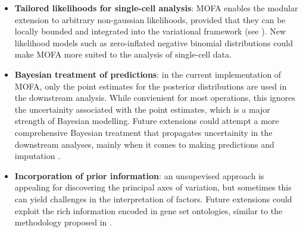 \begin{itemize}
	\item \textbf{Tailored likelihoods for single-cell analysis}: MOFA enables the modular extension to arbitrary non-gaussian likelihoods, provided that they can be locally bounded and integrated into the variational framework (see ). New likelihood models such as zero-inflated negative binomial distributions \cite{Risso2018} could make MOFA more suited to the analysis of single-cell data.

	\item \textbf{Bayesian treatment of predictions}: in the current implementation of MOFA, only the point estimates for the posterior distributions are used in the downstream analysis. While convienient for most operations, this ignores the uncertainity associated with the point estimates, which is a major strength of Bayesian modelling. Future extensions could attempt a more comprehensive Bayesian treatment that propagates uncertainity in the downstream analyses, mainly when it comes to making predictions and imputation \cite{Gelman2013}.

	\item \textbf{Incorporation of prior information}: an unsupevised approach is appealing for discovering the principal axes of variation, but sometimes this can yield challenges in the interpretation of factors. Future extensions could exploit the rich information encoded in gene set ontologies, similar to the methodology proposed in \cite{Buettner2017}.

\end{itemize}


